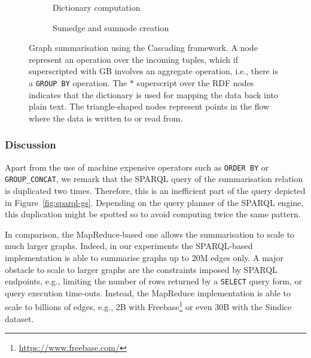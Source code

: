 \begin{figure}
	\centering
	\begin{subfigure}{\textwidth}
		\centering
		\resizebox{.6\textwidth}{!}{
			
		}
		\caption{Dictionary computation}
		\label{fig:dict-cascading}
	\end{subfigure}
	\qquad
	\begin{subfigure}{\textwidth}
		\centering
		\resizebox{\textwidth}{!}{
			
		}
		\caption{Sumedge and sumnode creation}
		\label{fig:va-cascading}
	\end{subfigure}
	\caption{Graph summarisation using the Cascading framework. A node represent an operation over the incoming tuples, which if superscripted with GB involves an aggregate operation, i.e., there is a \texttt{GROUP BY} operation. The $*$ superscript over the RDF nodes indicates that the dictionary is used for mapping the data back into plain text. The triangle-shaped nodes represent points in the flow where the data is written to or read from.}
	\label{fig:summary-cascading}
\end{figure}

\subsubsection{Discussion}

Apart from the use of machine expensive operators such as \texttt{ORDER BY} or \texttt{GROUP\_CONCAT}, we remark that the SPARQL query of the summarisation relation is duplicated two times. Therefore, this is an inefficient part of the query depicted in Figure~\ref{fig:sparql-gs}. Depending on the query planner of the SPARQL engine, this duplication might be spotted so to avoid computing twice the same pattern.

In comparison, the MapReduce-based one allows the summarisation to scale to much larger graphs. Indeed, in our experiments the SPARQL-based implementation is able to summarise graphs up to 20M edges only. A major obstacle to scale to larger graphs are the constraints imposed by SPARQL endpoints, e.g., limiting the number of rows returned by a \texttt{SELECT} query form, or query execution time-outs. Instead, the MapReduce implementation is able to scale to billions of edges, e.g., 2B with Freebase\footnote{\url{https://www.freebase.com/}} or even 30B with the Sindice dataset.

